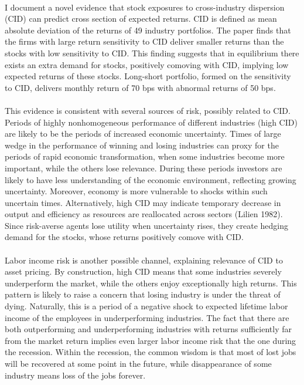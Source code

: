 \documentclass[12pt]{article}
\begin{document}
\paragraph{}
I document a novel evidence that stock exposures to cross-industry dispersion (CID) can predict cross section of expected returns. CID is defined as mean absolute deviation of the returns of 49 industry portfolios. The paper finds that the firms with large return sensitivity to CID deliver smaller returns than the stocks with low sensitivity to CID. This finding suggests that in equilibrium there exists an extra demand for stocks, positively comoving with CID, implying low expected returns of these stocks. Long-short portfolio, formed on the sensitivity to CID, delivers monthly return of 70 bps with abnormal returns of 50 bps.
\paragraph{}
This evidence is consistent with several sources of risk, possibly related to CID. Periods of highly nonhomogeneous performance of different industries (high CID) are likely to be the periods of increased economic uncertainty. Times of large wedge in the performance of winning and losing industries can proxy for the periods of rapid economic transformation, when some industries become more important, while the others lose relevance. During these periods investors are likely to have less understanding of the economic environment, reflecting growing uncertainty. Moreover, economy is more vulnerable to shocks within such uncertain times. Alternatively, high CID may indicate temporary decrease in output and efficiency as resources are reallocated across sectors (Lilien 1982). Since risk-averse agents lose utility when uncertainty rises, they create hedging demand for the stocks, whose returns positively comove with CID.
\paragraph{}
Labor income risk is another possible channel, explaining relevance of CID to asset pricing. By construction, high CID means that some industries severely underperform the market, while the others enjoy exceptionally high returns. This pattern is likely to raise a concern that losing industry is under the threat of dying. Naturally, this is a period of a negative shock to expected lifetime labor income of the employees in underperforming industries. The fact that there are both outperforming and underperforming industries with returns sufficiently far from the market return implies even larger labor income risk that the one during the recession. Within the recession, the common wisdom is that most of lost jobs will be recovered at some point in the future, while disappearance of some industry means loss of the jobs forever. 
\end{document}
